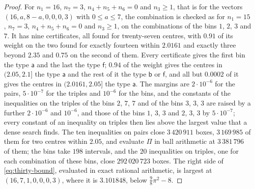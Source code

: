 \documentclass[11pt,reqno]{amsart}
\renewcommand{\_}{\origunderscore\allowbreak}
\numberwithin{equation}{section}
\theoremstyle{plain}
\theoremstyle{definition}
\theoremstyle{remark}
\begin{document}
\begin{proof}
For $n_1=16$, $n_7=3$, $n_4+n_5+n_6=0$ and $n_3\ge1$, that is for the
vectors $(16,a,8-a,0,0,0,3)$ with $0\le a\le7$, the combination is checked
as for $n_1=15$, $n_7=3$, $n_4+n_5+n_6=0$ and $n_3\ge1$, on the
combinations of the bins $1$, $2$, $3$ and $7$. It has nine certificates,
all found for twenty-seven centres, with $0.91$ of its weight on the two
found for exactly fourteen within $2.0161$ and exactly three beyond $2.35$
and $0.75$ on the second of them. Every certificate gives the first bin the
type $\mathsf a$ and the last the type $\mathsf f$; $0.94$ of the weight
gives the centres in $(2.05,2.1]$ the type $\mathsf a$ and the rest of it
the type $\mathsf b$ or $\mathsf f$, and all but $0.0002$ of it gives the
centres in $(2.0161,2.05]$ the type $\mathsf a$. The margins are
$2\cdot10^{-6}$ for the pairs, $5\cdot10^{-7}$ for the triples and
$10^{-6}$ for the bins, and the constants of the inequalities on the
triples of the bins $2$, $7$, $7$ and of the bins $3$, $3$, $3$ are raised
by a further $2\cdot10^{-6}$ and $10^{-6}$, and those of the bins $1$, $3$,
$3$ and $2$, $3$, $3$ by $5\cdot10^{-7}$; every constant of an inequality
on triples then lies above the largest value that a dense search finds.
The ten inequalities on pairs close $3\,420\,911$ boxes, $3\,169\,985$ of
them for two centres within $2.05$, and evaluate $\Pi$ in ball arithmetic
at $3\,381\,796$ of them; the bins take $198$ intervals, and the $20$
inequalities on triples, one for each combination of these bins, close
$292\,020\,723$ boxes. The right side of \eqref{eq:thirty-bound},
evaluated in exact rational arithmetic, is largest at $(16,7,1,0,0,0,3)$,
where it is $3.101848$, below $\frac98\pi^2-8$.


\end{proof}
\end{document}
